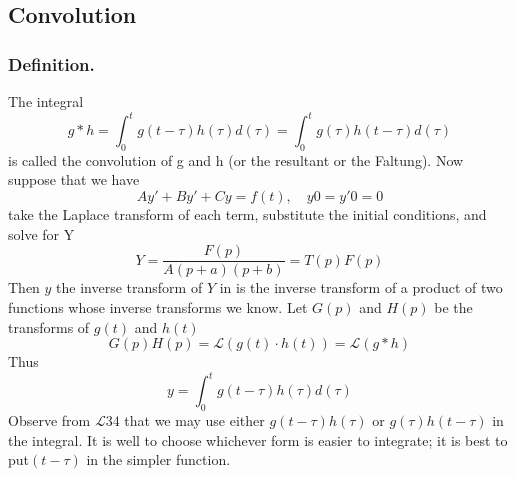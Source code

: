 \documentclass[../main.tex]{subfiles}
\begin{document}
\subsection*{Convolution}
\subsubsection*{Definition.} The integral
\begin{equation*}
    g*h=\int_{0}^{t}g(t-\tau)h(\tau)d(\tau)=\int_{0}^{t}g(\tau)h(t-\tau)d(\tau)
\end{equation*}
is called the convolution of g and h (or the resultant or the Faltung).
Now suppose that we have
\begin{equation*}
    Ay' + By' + Cy = f (t), \quad y0 = y'0 = 0
\end{equation*}
take the Laplace transform of each term, substitute the initial conditions, and solve for Y
\begin{equation*}
    Y=\frac{F(p)}{A(p + a)(p + b)}=T(p)F(p)
\end{equation*}
Then $y$ the inverse transform of $Y$ in is the inverse transform of a product of two functions whose inverse transforms we know.
Let $G(p)$ and $H(p)$ be the transforms of $g(t)$ and $h(t)$
\begin{equation*}
    G(p)H(p)=\mathcal{L}(g(t)\cdot h(t))=\mathcal{L}(g*h)
\end{equation*}
Thus
\begin{equation*}
    y=\int_{0}^{t}g(t-\tau)h(\tau)d(\tau)
\end{equation*}
Observe from $\mathcal{L}34$ that we may use either $g(t - \tau )h(\tau )$ or $g(\tau )h(t - \tau )$ in the integral.
It is well to choose whichever form is easier to integrate; it is best to put$ (t - \tau )$ in the simpler function.
\end{document}
